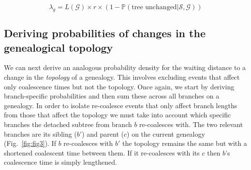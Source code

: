 \documentclass[11pt]{article}
\begin{document}
\begin{equation}
	\lambda_{g} = 
	L(\mathcal{G}) \times r \times 
	(1 - \mathbb{P}(\text{tree unchanged} | \mathcal{S},\mathcal{G}))
\end{equation}


\subsection{Deriving probabilities of changes in the genealogical topology}

We can next derive an analogous probability density for the waiting distance 
to a change in the \emph{topology} of a genealogy. This involves excluding 
events that affect only coalescence times but not the topology.
Once again, we start by deriving branch-specific probabilities and then sum 
these across all branches on a genealogy. 
In order to isolate re-coalesce events that only affect branch
lengths from those that affect the topology we must take into account which 
specific branches the detached subtree from branch $b$ re-coalesces with. 
The two relevant branches are its sibling ($b'$) and parent ($c$)
on the current genealogy (Fig.~\ref{fig:fig3}). 
If $b$ re-coalesces with $b'$ the topology remains the same but with a 
shortened coalescent time between them. If it re-coalesces with its $c$
then $b$'s coalescence time is simply lengthened. 

\end{document}
